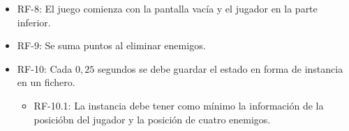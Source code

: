 \begin{itemize}
    \item RF-8: El juego comienza con la pantalla vacía y el jugador en la parte inferior.
    \item RF-9: Se suma puntos al eliminar enemigos.
    \item RF-10: Cada $0,25$ segundos se debe guardar el estado en forma de instancia en un fichero.
        \begin{itemize}
            \item RF-10.1: La instancia debe tener como mínimo la información de la posicióbn del jugador y la posición de cuatro enemigos. 
        \end{itemize}
\end{itemize}